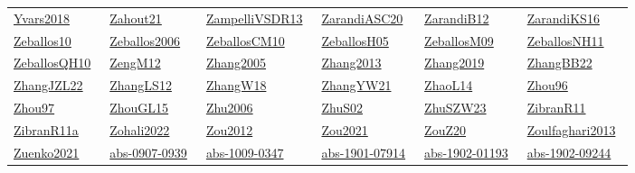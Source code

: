 \begin{longtable}{*{6}{l}}
\href{../works/Yvars2018.pdf}{Yvars2018}~\cite{Yvars2018} & \href{../works/Zahout21.pdf}{Zahout21}~\cite{Zahout21} & \href{../works/ZampelliVSDR13.pdf}{ZampelliVSDR13}~\cite{ZampelliVSDR13} & \href{../works/ZarandiASC20.pdf}{ZarandiASC20}~\cite{ZarandiASC20} & \href{../}{ZarandiB12}~\cite{ZarandiB12} & \href{../works/ZarandiKS16.pdf}{ZarandiKS16}~\cite{ZarandiKS16}\\ 
\href{../works/Zeballos10.pdf}{Zeballos10}~\cite{Zeballos10} & \href{../}{Zeballos2006}~\cite{Zeballos2006} & \href{../works/ZeballosCM10.pdf}{ZeballosCM10}~\cite{ZeballosCM10} & \href{../works/ZeballosH05.pdf}{ZeballosH05}~\cite{ZeballosH05} & \href{../works/ZeballosM09.pdf}{ZeballosM09}~\cite{ZeballosM09} & \href{../works/ZeballosNH11.pdf}{ZeballosNH11}~\cite{ZeballosNH11}\\ 
\href{../works/ZeballosQH10.pdf}{ZeballosQH10}~\cite{ZeballosQH10} & \href{../works/ZengM12.pdf}{ZengM12}~\cite{ZengM12} & \href{../works/Zhang2005.pdf}{Zhang2005}~\cite{Zhang2005} & \href{../works/Zhang2013.pdf}{Zhang2013}~\cite{Zhang2013} & \href{../}{Zhang2019}~\cite{Zhang2019} & \href{../works/ZhangBB22.pdf}{ZhangBB22}~\cite{ZhangBB22}\\ 
\href{../works/ZhangJZL22.pdf}{ZhangJZL22}~\cite{ZhangJZL22} & \href{../works/ZhangLS12.pdf}{ZhangLS12}~\cite{ZhangLS12} & \href{../works/ZhangW18.pdf}{ZhangW18}~\cite{ZhangW18} & \href{../works/ZhangYW21.pdf}{ZhangYW21}~\cite{ZhangYW21} & \href{../works/ZhaoL14.pdf}{ZhaoL14}~\cite{ZhaoL14} & \href{../works/Zhou96.pdf}{Zhou96}~\cite{Zhou96}\\ 
\href{../works/Zhou97.pdf}{Zhou97}~\cite{Zhou97} & \href{../works/ZhouGL15.pdf}{ZhouGL15}~\cite{ZhouGL15} & \href{../}{Zhu2006}~\cite{Zhu2006} & \href{../works/ZhuS02.pdf}{ZhuS02}~\cite{ZhuS02} & \href{../works/ZhuSZW23.pdf}{ZhuSZW23}~\cite{ZhuSZW23} & \href{../works/ZibranR11.pdf}{ZibranR11}~\cite{ZibranR11}\\ 
\href{../works/ZibranR11a.pdf}{ZibranR11a}~\cite{ZibranR11a} & \href{../}{Zohali2022}~\cite{Zohali2022} & \href{../works/Zou2012.pdf}{Zou2012}~\cite{Zou2012} & \href{../works/Zou2021.pdf}{Zou2021}~\cite{Zou2021} & \href{../works/ZouZ20.pdf}{ZouZ20}~\cite{ZouZ20} & \href{../}{Zoulfaghari2013}~\cite{Zoulfaghari2013}\\ 
\href{../works/Zuenko2021.pdf}{Zuenko2021}~\cite{Zuenko2021} & \href{../works/abs-0907-0939.pdf}{abs-0907-0939}~\cite{abs-0907-0939} & \href{../works/abs-1009-0347.pdf}{abs-1009-0347}~\cite{abs-1009-0347} & \href{../works/abs-1901-07914.pdf}{abs-1901-07914}~\cite{abs-1901-07914} & \href{../works/abs-1902-01193.pdf}{abs-1902-01193}~\cite{abs-1902-01193} & \href{../works/abs-1902-09244.pdf}{abs-1902-09244}~\cite{abs-1902-09244}\\ 

\end{longtable}
